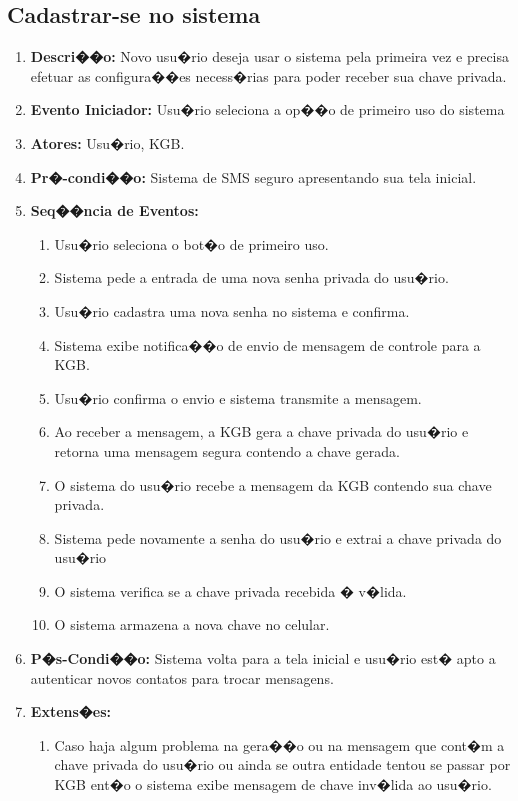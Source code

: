 \documentclass[a4paper,capchap,espacoduplo,normaltoc]{abntepusp}
\begin{document}
\subsection{Cadastrar-se no sistema}
	 \begin{enumerate} 
	 \item \textbf{Descri��o:} Novo usu�rio deseja usar o sistema pela primeira vez e precisa efetuar as configura��es necess�rias para poder receber sua chave privada.
   \item \textbf{Evento Iniciador:} Usu�rio seleciona a op��o de primeiro uso do sistema
	 \item \textbf{Atores:} Usu�rio, KGB.
	 \item \textbf{Pr�-condi��o:} Sistema de SMS seguro apresentando sua tela inicial.
	 \item \textbf{Seq��ncia de Eventos:} 
	 \begin{enumerate}
			\item Usu�rio seleciona o bot�o de primeiro uso.
			\item Sistema pede a entrada de uma nova senha privada do usu�rio.
			\item Usu�rio cadastra uma nova senha no sistema e confirma.
			\item Sistema exibe notifica��o de envio de mensagem de controle para a KGB.
			\item Usu�rio confirma o envio e sistema transmite a mensagem.
			\item Ao receber a mensagem, a KGB gera a chave privada do usu�rio e retorna uma mensagem segura contendo a chave gerada.
			\item O sistema do usu�rio recebe a mensagem da KGB contendo sua chave privada.
			\item Sistema pede novamente a senha do usu�rio e extrai a chave privada do usu�rio
			\item O sistema verifica se a chave privada recebida � v�lida.
			\item O sistema armazena a nova chave no celular.
		\end{enumerate}
		\item \textbf{P�s-Condi��o:} Sistema volta para a tela inicial e usu�rio est� apto a autenticar novos contatos para trocar mensagens.
		\item \textbf{Extens�es:} 
		\begin{enumerate}
		\item Caso haja algum problema na gera��o ou na mensagem que cont�m a chave privada do usu�rio ou ainda se outra entidade tentou se passar por KGB ent�o o sistema exibe mensagem de chave inv�lida ao usu�rio.
		\end{enumerate}
\end{enumerate}
		
\end{document}
